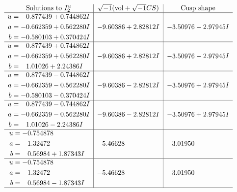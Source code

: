 \documentclass[1p]{elsarticle_modified}
\theoremstyle{definition}
\newcommand{\I}{\sqrt{-1}}
\begin{document}
$$\begin{array}{c|c|c}  
\text{Solutions to }I^u_{2}& \I (\text{vol} + \sqrt{-1}CS) & \text{Cusp shape}\\
 \hline 
\begin{aligned}
u &= \phantom{-}0.877439 + 0.744862 I \\
a &= -0.662359 + 0.562280 I \\
b &= -0.580103 + 0.370424 I\end{aligned}
 & -9.60386 + 2.82812 I & -3.50976 - 2.97945 I \\ \hline\begin{aligned}
u &= \phantom{-}0.877439 + 0.744862 I \\
a &= -0.662359 + 0.562280 I \\
b &= \phantom{-}1.01026 + 2.24386 I\end{aligned}
 & -9.60386 + 2.82812 I & -3.50976 - 2.97945 I \\ \hline\begin{aligned}
u &= \phantom{-}0.877439 - 0.744862 I \\
a &= -0.662359 - 0.562280 I \\
b &= -0.580103 - 0.370424 I\end{aligned}
 & -9.60386 - 2.82812 I & -3.50976 + 2.97945 I \\ \hline\begin{aligned}
u &= \phantom{-}0.877439 - 0.744862 I \\
a &= -0.662359 - 0.562280 I \\
b &= \phantom{-}1.01026 - 2.24386 I\end{aligned}
 & -9.60386 - 2.82812 I & -3.50976 + 2.97945 I \\ \hline\begin{aligned}
u &= -0.754878\phantom{ +0.000000I} \\
a &= \phantom{-}1.32472\phantom{ +0.000000I} \\
b &= \phantom{-}0.56984 + 1.87343 I\end{aligned}
 & -5.46628\phantom{ +0.000000I} & \phantom{-}3.01950\phantom{ +0.000000I} \\ \hline\begin{aligned}
u &= -0.754878\phantom{ +0.000000I} \\
a &= \phantom{-}1.32472\phantom{ +0.000000I} \\
b &= \phantom{-}0.56984 - 1.87343 I\end{aligned}
 & -5.46628\phantom{ +0.000000I} & \phantom{-}3.01950\phantom{ +0.000000I}\\
 \hline 
 \end{array}$$\newpage\newpage\renewcommand{\arraystretch}{1}
\end{document}
